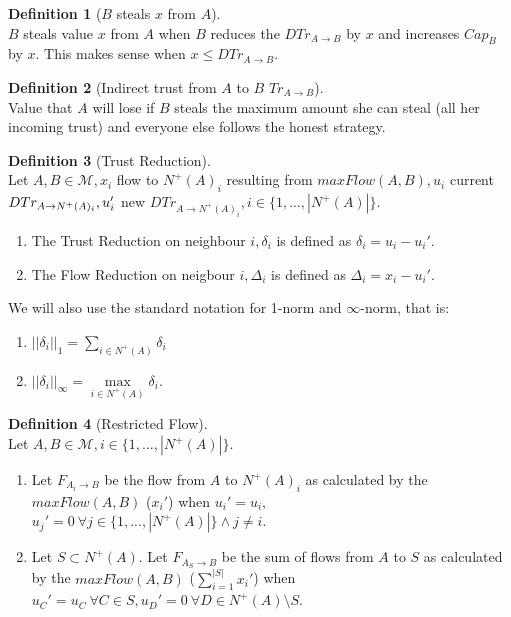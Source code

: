 \documentclass[11pt]{article}
\theoremstyle{definition}
\newtheorem{definition}{Definition}[section]
\theoremstyle{corollary}
\begin{document}
      \begin{definition}[$B$ steals $x$ from $A$] \ \\
         $B$ steals value $x$ from $A$ when $B$ reduces the $DTr_{A \rightarrow B}$ by $x$ and increases $Cap_B$ by $x$.
         This makes sense when $x \leq DTr_{A \rightarrow B}$.
      \end{definition}
      \begin{definition}[Indirect trust from $A$ to $B$ $Tr_{A \rightarrow B}$] \ \\
         Value that $A$ will lose if $B$ steals the maximum amount she can steal (all her incoming trust) and everyone
         else follows the honest strategy.
      \end{definition}
      \begin{definition}[Trust Reduction] \ \\
         Let $A, B \in \mathcal{M}, x_i$ flow to $N^{+}(A)_i$ resulting from $maxFlow(A,B), u_i$ current
         $DTr_{A \rightarrow N^{+}(A)_i}, \\ u_i'$ new $DTr_{A \rightarrow N^{+}(A)_i}, i \in \{1,...,|N^{+}(A)|\}$.
         \begin{enumerate}
            \item The Trust Reduction on neighbour $i, \delta_i$ is defined as $\delta_i = u_i - u_i'$.
            \item The Flow Reduction on neigbour $i, \Delta_i$ is defined as $\Delta_i = x_i - u_i'$.
         \end{enumerate}
         We will also use the standard notation for 1-norm and $\infty$-norm, that is:
         \begin{enumerate}
            \item $||\delta_i||_1 = \sum\limits_{i \in N^{+}(A)}\delta_i$
            \item $||\delta_i||_\infty = \max\limits_{i \in N^{+}(A)}\delta_i$.
         \end{enumerate}
      \end{definition}
      \begin{definition}[Restricted Flow] \ \\
         Let $A, B \in \mathcal{M}, i \in \{1,...,|N^{+}(A)|\}$.
         \begin{enumerate}
            \item Let $F_{A_i \rightarrow B}$ be the flow from $A$ to $N^{+}(A)_i$ as calculated by the $maxFlow(A,B)$
               ($x_i'$) when $u_i' = u_i,$ \\ $u_j' = 0 \:\forall j \in \{1,...,|N^{+}(A)|\} \wedge j \neq i$.
            \item Let $S \subset N^{+}(A)$. Let $F_{A_S \rightarrow B}$ be the sum of flows from $A$ to $S$ as
               calculated by the $maxFlow(A,B)$ ($\sum\limits_{i=1}^{|S|}x_i'$) when $u_C' = u_C \: \forall C \in S,
               u_D' = 0 \: \forall D \in N^{+}(A) \setminus S$.
         \end{enumerate}
      \end{definition}
\end{document}
